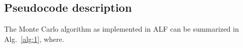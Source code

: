 %
\subsection{Pseudocode description}\label{sec:pseudocode}

The Monte Carlo algorithm as implemented in ALF can be summarized in Alg.~\ref{alg:1}, where.

